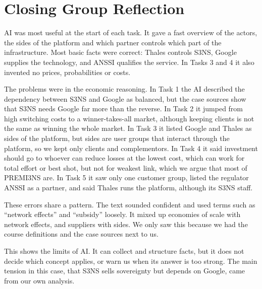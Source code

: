 \section*{Closing Group Reflection}
\label{sec:reflection}

AI was most useful at the start of each task. It gave a fast overview of the actors, the sides of the platform and which partner controls which part of the infrastructure. Most basic facts were correct: Thales controls S3NS, Google supplies the technology, and ANSSI qualifies the service. In Tasks 3 and 4 it also invented no prices, probabilities or costs.

The problems were in the economic reasoning. In Task 1 the AI described the dependency between S3NS and Google as balanced, but the case sources show that S3NS needs Google far more than the reverse. In Task 2 it jumped from high switching costs to a winner-takes-all market, although keeping clients is not the same as winning the whole market. In Task 3 it listed Google and Thales as sides of the platform, but sides are user groups that interact through the platform, so we kept only clients and complementors. In Task 4 it said investment should go to whoever can reduce losses at the lowest cost, which can work for total effort or best shot, but not for weakest link, which we argue that most of PREMI3NS are. In Task 5 it saw only one customer group, listed the regulator ANSSI as a partner, and said Thales runs the platform, although its S3NS staff.

These errors share a pattern. The text sounded confident and used terms such as ``network effects'' and ``subsidy'' loosely. It mixed up economies of scale with network effects, and suppliers with sides. We only saw this because we had the course definitions and the case sources next to us.

This shows the limits of AI. It can collect and structure facts, but it does not decide which concept applies, or warn us when its answer is too strong. The main tension in this case, that S3NS sells sovereignty but depends on Google, came from our own analysis.
